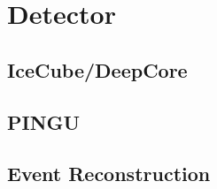 \chapter{Detector}
\label{sec:det}


\section{IceCube/DeepCore}
\label{sec:ICDC}


\section{PINGU}
\label{sec:PINGU}


\section{Event Reconstruction}
\label{sec:EvtReco}
